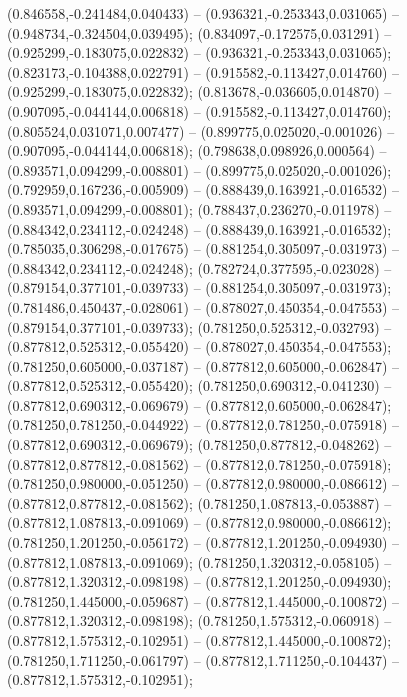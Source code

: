  (0.846558,-0.241484,0.040433) -- (0.936321,-0.253343,0.031065) -- (0.948734,-0.324504,0.039495);
 (0.834097,-0.172575,0.031291) -- (0.925299,-0.183075,0.022832) -- (0.936321,-0.253343,0.031065);
 (0.823173,-0.104388,0.022791) -- (0.915582,-0.113427,0.014760) -- (0.925299,-0.183075,0.022832);
 (0.813678,-0.036605,0.014870) -- (0.907095,-0.044144,0.006818) -- (0.915582,-0.113427,0.014760);
 (0.805524,0.031071,0.007477) -- (0.899775,0.025020,-0.001026) -- (0.907095,-0.044144,0.006818);
 (0.798638,0.098926,0.000564) -- (0.893571,0.094299,-0.008801) -- (0.899775,0.025020,-0.001026);
 (0.792959,0.167236,-0.005909) -- (0.888439,0.163921,-0.016532) -- (0.893571,0.094299,-0.008801);
 (0.788437,0.236270,-0.011978) -- (0.884342,0.234112,-0.024248) -- (0.888439,0.163921,-0.016532);
 (0.785035,0.306298,-0.017675) -- (0.881254,0.305097,-0.031973) -- (0.884342,0.234112,-0.024248);
 (0.782724,0.377595,-0.023028) -- (0.879154,0.377101,-0.039733) -- (0.881254,0.305097,-0.031973);
 (0.781486,0.450437,-0.028061) -- (0.878027,0.450354,-0.047553) -- (0.879154,0.377101,-0.039733);
 (0.781250,0.525312,-0.032793) -- (0.877812,0.525312,-0.055420) -- (0.878027,0.450354,-0.047553);
 (0.781250,0.605000,-0.037187) -- (0.877812,0.605000,-0.062847) -- (0.877812,0.525312,-0.055420);
 (0.781250,0.690312,-0.041230) -- (0.877812,0.690312,-0.069679) -- (0.877812,0.605000,-0.062847);
 (0.781250,0.781250,-0.044922) -- (0.877812,0.781250,-0.075918) -- (0.877812,0.690312,-0.069679);
 (0.781250,0.877812,-0.048262) -- (0.877812,0.877812,-0.081562) -- (0.877812,0.781250,-0.075918);
 (0.781250,0.980000,-0.051250) -- (0.877812,0.980000,-0.086612) -- (0.877812,0.877812,-0.081562);
 (0.781250,1.087813,-0.053887) -- (0.877812,1.087813,-0.091069) -- (0.877812,0.980000,-0.086612);
 (0.781250,1.201250,-0.056172) -- (0.877812,1.201250,-0.094930) -- (0.877812,1.087813,-0.091069);
 (0.781250,1.320312,-0.058105) -- (0.877812,1.320312,-0.098198) -- (0.877812,1.201250,-0.094930);
 (0.781250,1.445000,-0.059687) -- (0.877812,1.445000,-0.100872) -- (0.877812,1.320312,-0.098198);
 (0.781250,1.575312,-0.060918) -- (0.877812,1.575312,-0.102951) -- (0.877812,1.445000,-0.100872);
 (0.781250,1.711250,-0.061797) -- (0.877812,1.711250,-0.104437) -- (0.877812,1.575312,-0.102951);

